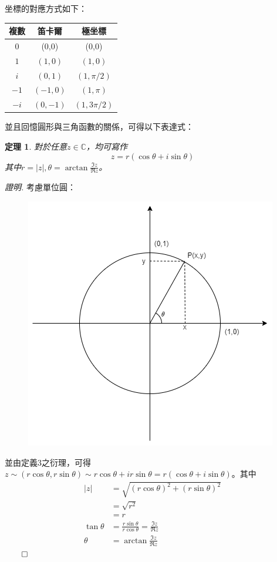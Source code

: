 \documentclass[12pt]{article}
\newtheorem*{theorem}{定理}
\renewenvironment*{proof}{\textit{證明.}}{\hfill$\qed$}
\begin{document}
    坐標的對應方式如下：

    \begin{center}
        \begin{tabular}{|c|c|c|}
            \hline
            複數&笛卡爾&極坐標\\
            \hline
            0&(0,0)&(0,0)\\
            \hline
            $1$&$(1,0)$&$(1,0)$\\
            \hline
            $i$&$(0,1)$&$(1,\pi/2)$\\
            \hline
            $-1$&$(-1,0)$&$(1,\pi)$\\
            \hline
            $-i$&$(0,-1)$&$(1,3\pi/2)$\\
            \hline
        \end{tabular}
    \end{center}

    並且回憶圓形與三角函數的關係，可得以下表達式：

    \begin{theorem}
        對於任意$z\in\mathbb{C}$，均可寫作$$z=r(\cos{\theta}+i\sin{\theta})$$其中$r=|z|,\theta=\arctan{\frac{\Im{z}}{\Re{z}}}$。
    \end{theorem}

    \begin{proof}
        考慮單位圓：
        \begin{figure}[H]
            \centering
            \includegraphics[scale=0.6]{circle1.png}
        \end{figure}
        並由定義3之衍理，可得$z\sim(r\cos{\theta},r\sin{\theta})\sim r\cos{\theta}+ir\sin{\theta}=r(\cos{\theta}+i\sin{\theta})$。其中\begin{align*}
            |z|&=\sqrt{(r\cos{\theta})^2+(r\sin{\theta})^2}\\
            &=\sqrt{r^2}\\
            &=r\\
            \tan{\theta}&=\frac{r\sin{\theta}}{r\cos{\theta}}=\frac{\Im{z}}{\Re{z}}\\
            \theta&=\arctan{\frac{\Im{z}}{\Re{z}}}
        \end{align*}
    \end{proof}
\end{document}
